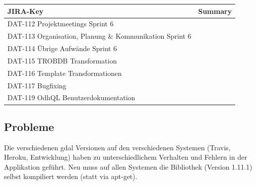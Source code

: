 \begin{table}[H]	
\centering
\begin{tabular}{ll}
	\toprule
	\textbf{JIRA-Key} & \textbf{Summary}\\
	\midrule
DAT-112	Projektmeetings Sprint 6\\
DAT-113	Organisation, Planung \& Kommunikation Sprint 6\\
DAT-114	Übrige Aufwände Sprint 6\\
DAT-115	TROBDB Transformation\\
DAT-116	Template Transformationen\\
DAT-117	Bugfixing\\
DAT-119	OdhQL Benutzerdokumentation\\
	\bottomrule
\end{tabular}	
\end{table}

\subsection*{Probleme}
Die verschiedenen \acs{gdal} Versionen auf den verschiedenen Systemen (Travis, Heroku, Entwicklung) haben zu unterschiedlichem Verhalten und Fehlern in der Applikation geführt. Neu muss auf allen Systemen die Bibliothek (Version 1.11.1) selbst kompiliert werden (statt via apt-get).